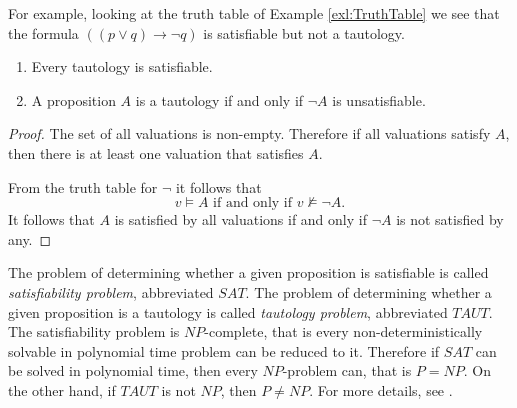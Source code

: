 \begin{page}
\setcounter{section}{1}
\setcounter{subsection}{3}
\setcounter{dfn}{5}
\label{portion:423}


For example, looking at the truth table of Example \ref{exl:TruthTable} we see that the formula $((p \vee q) \to \neg q)$ is satisfiable but not a tautology.


\end{page}

\begin{page}
\setcounter{section}{1}
\setcounter{subsection}{3}
\setcounter{dfn}{6}
\label{portion:425}

\begin{thm}
\begin{enumerate}
\item
Every tautology is satisfiable.
\item
A proposition $A$ is a tautology if and only if $\neg A$ is unsatisfiable.
\end{enumerate}
\end{thm}

\end{page}

\begin{page}
\setcounter{section}{1}
\setcounter{subsection}{3}
\setcounter{dfn}{6}
\label{portion:426}

\begin{proof}
The set of all valuations is non-empty.
Therefore if all valuations satisfy $A$, then there is at least one valuation that satisfies $A$.

From the truth table for $\neg$ it follows that
\[
v \vDash A \text{ if and only if } v \nvDash \neg A.
\]
It follows that $A$ is satisfied by all valuations if and only if $\neg A$ is not satisfied by any.
\end{proof}

The problem of determining whether a given proposition is satisfiable is called \emph{satisfiability problem}, abbreviated $SAT$.
The problem of determining whether a given proposition is a tautology is called \emph{tautology problem}, abbreviated $TAUT$.
The satisfiability problem is $NP$-complete, that is every non-deterministically solvable in polynomial time problem can be reduced to it.
Therefore if $SAT$ can be solved in polynomial time, then every $NP$-problem can, that is $P=NP$.
On the other hand, if $TAUT$ is not $NP$, then $P \ne NP$.
For more details, see \cite[Section 3.3.5]{Gallier}.


\end{page}


